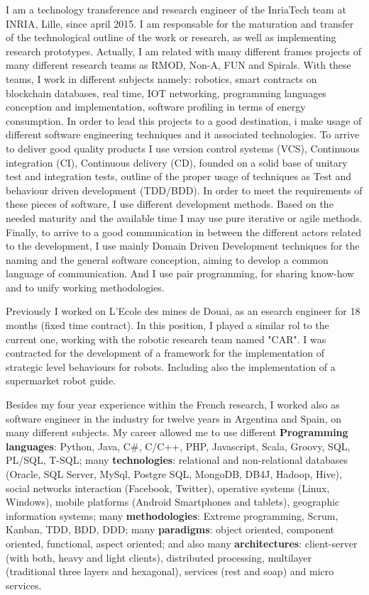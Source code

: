 \documentclass[11pt]{letter} %
\begin{document}
\begin{letter}{}
  I am a technology transference and research engineer of the InriaTech team at INRIA, Lille, since april 2015. 
  I am responsable for the maturation and transfer of the technological outline of the work or research,  as well as implementing research prototypes.  
  Actually, I am related with many different frames projects of many different research teams as RMOD, Non-A, FUN and Spirals. 
  With these teams, I work in different subjects namely: robotics, smart contracts on blockchain databases, real time, IOT networking, programming languages conception and implementation, software profiling in terms of energy consumption.
  In order to lead this projects to a good destination, i make usage of different software engineering techniques and it associated technologies. 
  To arrive to deliver good quality products I use version control systems (VCS), Continuous integration (CI), Continuous delivery (CD), founded on a solid base of unitary test and integration tests, outline of the proper usage of techniques as Test and behaviour driven development  (TDD/BDD). 
  In order to meet the requirements of these pieces of software, I use different development methods. Based on the needed maturity and the available time I may use pure iterative or agile methods. 
  Finally, to arrive to a good communication in between the different actors related to the development, I use mainly Domain Driven Development techniques for the naming and the general software conception, aiming to develop a common language of communication. And I use pair programming, for sharing know-how and to unify working methodologies. 
  
  
Previously I worked on L'Ecole des mines de Douai, as an esearch engineer for 18 months (fixed time contract). In this position, I played a similar rol to the current one, working with the robotic research team named "CAR". I was contracted for the development of a framework for the implementation of strategic level behaviours for robots. Including also the implementation of a supermarket robot guide.

Besides my four year experience within the French research, I worked also as software engineer in the industry for twelve years in Argentina and Spain, on many different subjects.
My career allowed me to use different \textbf{Programming languages}: Python, Java, C\#, C/C++, PHP, Javascript, Scala, Groovy, SQL, PL/SQL, T-SQL; many \textbf{technologies}: relational and non-relational databases (Oracle, SQL Server, MySql, Postgre SQL, MongoDB, DB4J, Hadoop, Hive), social networks interaction (Facebook, Twitter), operative systems  (Linux, Windows), mobile platforms (Android Smartphones and tablets), geographic information systems; many  \textbf{methodologies}: Extreme programming, Scrum, Kanban, TDD, BDD, DDD; many 
\textbf{paradigms}: object oriented, component oriented, functional, aspect oriented; and also many \textbf{architectures}: client-server (with both, heavy and light clients), distributed processing, multilayer (traditional three layers and hexagonal), services (rest and soap) and micro services. 


\end{letter}
\end{document}

